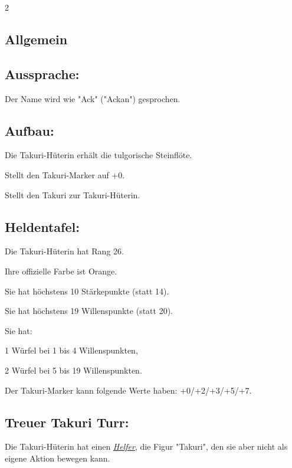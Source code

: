 \documentclass[10pt, a4paper, oneside]{book}
\newcommand{\fan}[1]{\textit{#1}}
\begin{document}
\begin{multicols*}{2}\raggedcolumns


\begin{nobgcolor}

\section{Allgemein}


\subsection{Aussprache:}

Der Name wird wie "Ack" ("Ackan") gesprochen.
\supercite{mh-begleitheft}


\subsection{Aufbau:}

Die Takuri-Hüterin erhält die tulgorische Steinflöte.

Stellt den Takuri-Marker auf +0.
\supercite{mh-takuri}

Stellt den Takuri zur Takuri-Hüterin.
\supercite{mh-begleitheft}




\subsection{Heldentafel:}

Die Takuri-Hüterin hat Rang 26.

Ihre offizielle Farbe ist Orange.

Sie hat höchstens 10 Stärkepunkte (statt 14).

Sie hat höchstens 19 Willenspunkte (statt 20).

Sie hat:

\bullet{} 1 Würfel bei 1 bis 4 Willenspunkten, 

\bullet{} 2 Würfel bei 5 bis 19 Willenspunkten.

Der Takuri-Marker kann folgende Werte haben: +0/+2/+3/+5/+7.








\subsection{Treuer Takuri Turr:}

Die Takuri-Hüterin hat einen \hyperref[helfer]{\fan{Helfer}}, die Figur "Takuri", den sie aber nicht als eigene Aktion bewegen kann.


\end{nobgcolor}
\end{multicols*}
\end{document}
